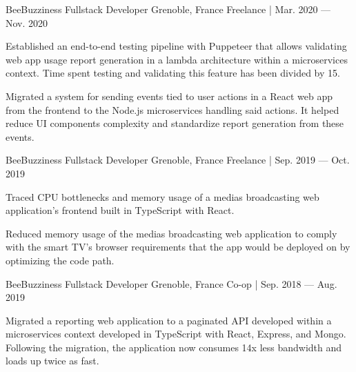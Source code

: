 

\begin{cventries}
    \cventry
    {BeeBuzziness} %
    {Fullstack Developer} %
    {Grenoble, France} %
    {Freelance | Mar. 2020 — Nov. 2020} %
    {
    \begin{cvitems} %
        \item {Established an end-to-end testing pipeline with Puppeteer that allows validating web app usage report generation in a lambda architecture within a microservices context.
        Time spent testing and validating this feature has been divided by 15.}
        \item {Migrated a system for sending events tied to user actions in a React web app from the frontend to the Node.js microservices handling said actions.
        It helped reduce UI components complexity and standardize report generation from these events.}
    \end{cvitems}
    }

    \cventry
    {BeeBuzziness} %
    {Fullstack Developer} %
    {Grenoble, France} %
    {Freelance | Sep. 2019 — Oct. 2019} %
    {
    \begin{cvitems} %
        \item {Traced CPU bottlenecks and memory usage of a medias broadcasting web application's frontend built in TypeScript with React.}
        \item {Reduced memory usage of the medias broadcasting web application to comply with the smart TV's browser requirements that the app would be deployed on by optimizing the code path.}
    \end{cvitems}
    }

    \cventry
    {BeeBuzziness} %
    {Fullstack Developer} %
    {Grenoble, France} %
    {Co-op | Sep. 2018 — Aug. 2019} %
    {
    \begin{cvitems} %
        \item {Migrated a reporting web application to a paginated API developed within a microservices context developed in TypeScript with React, Express, and Mongo.
        Following the migration, the application now consumes 14x less bandwidth and loads up twice as fast.}
    \end{cvitems}
    }


\end{cventries}
